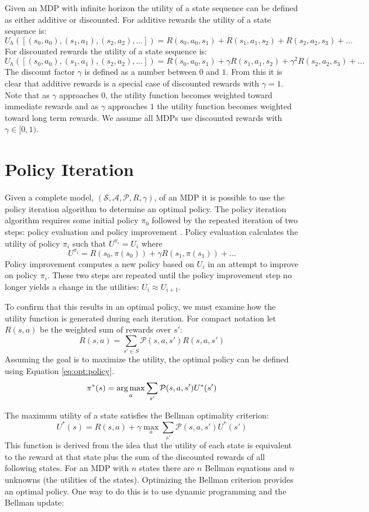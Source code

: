 Given an MDP with infinite horizon the utility of a state sequence can be defined as either additive or discounted. For additive rewards the utility of a state sequence is:
\[
    U_h([(s_0,a_0),(s_1,a_1),(s_2,a_2),...]) = R(s_0,a_0,s_1) + R(s_1,a_1,s_2) + R(s_2,a_2,s_3) + ...
\]
For discounted rewards the utility of a state sequence is:
\[
    U_h([(s_0,a_0),(s_1,a_1),(s_2,a_2),...]) = R(s_0,a_0,s_1) + \gamma R(s_1,a_1,s_2) + \gamma^2 R(s_2,a_2,s_3) + ...
\]
The discount factor $\gamma$ is defined as a number between $0$ and $1$. From this it is clear that additive rewards is a special case of discounted rewards with $\gamma = 1$.  Note that as $\gamma$ approaches $0$, the utility function becomes weighted toward immediate rewards and as $\gamma$ approaches $1$ the utility function becomes weighted toward long term rewards. We assume all MDPs use discounted rewards with $\gamma \in [0, 1)$.

\section{Policy Iteration}

Given a complete model, $(\mathcal{S, A, P}, R, \gamma)$, of an MDP it is possible to use the policy iteration algorithm to determine an optimal policy. The policy iteration algorithm requires some initial policy $\pi_0$ followed by the repeated iteration of two steps: policy evaluation and policy improvement \cite{norvig}. Policy evaluation calculates the utility of policy $\pi_i$ such that $U^{\pi_i} = U_i$ where 
\[
    U^{\pi_i} = R(s_0,\pi(s_0)) + \gamma R(s_1,\pi(s_1)) + ...
\] 
Policy improvement computes a new policy based on $U_i$ in an attempt to improve on policy $\pi_i$. These two steps are repeated until the policy improvement step no longer yields a change in the utilities: $U_i \approx U_{i+1}$.

To confirm that this results in an optimal policy, we must examine how the utility function is generated during each iteration. For compact notation let $R(s,a)$ be the weighted sum of rewards over $s'$:
\[
    R(s,a) = \sum_{s' \in S} \mathcal{P}(s,a,s')R(s,a,s')
\]
Assuming the goal is to maximize the utility, the optimal policy can be defined using Equation \ref{eq:opt:policy}.
\begin{equation}
    \pi^*(s) = \operatorname*{arg\,max}_a \sum_{s'} \mathcal{P}(s,a,s')U^*(s')
    \label{eq:opt:policy}
\end{equation}

The maximum utility of a state satisfies the Bellman optimality criterion:
\[
    U^*(s) = R(s,a) + \gamma \max_a \sum_{s'}\mathcal{P}(s,a,s')U^*(s')
\]
This function is derived from the idea that the utility of each state is equivalent to the reward at that state plus the sum of the discounted rewards of all following states. For an MDP with $n$ states there are $n$ Bellman equations and $n$ unknowns (the utilities of the states). Optimizing the Bellman criterion provides an optimal policy. One way to do this is to use dynamic programming and the Bellman update:

